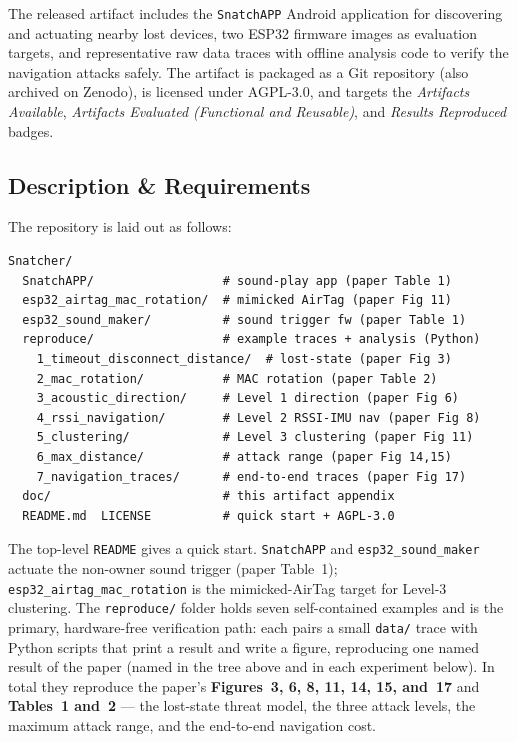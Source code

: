 \documentclass[nonacm,sigconf]{acmart}
\begin{document}
The released artifact includes the \texttt{SnatchAPP} Android application for
discovering and actuating nearby lost devices, two ESP32 firmware images as
evaluation targets, and representative raw data traces with offline analysis
code to verify the navigation attacks safely. The artifact is packaged as a Git
repository (also archived on Zenodo), is licensed under AGPL-3.0, and targets the
\emph{Artifacts Available}, \emph{Artifacts Evaluated (Functional and
Reusable)}, and \emph{Results Reproduced} badges.

\subsection{Description \& Requirements}
The repository is laid out as follows:

\noindent\begin{minipage}{\linewidth}
\begin{lstlisting}
Snatcher/
  SnatchAPP/                  # sound-play app (paper Table 1)
  esp32_airtag_mac_rotation/  # mimicked AirTag (paper Fig 11)
  esp32_sound_maker/          # sound trigger fw (paper Table 1)
  reproduce/                  # example traces + analysis (Python)
    1_timeout_disconnect_distance/  # lost-state (paper Fig 3)
    2_mac_rotation/           # MAC rotation (paper Table 2)
    3_acoustic_direction/     # Level 1 direction (paper Fig 6)
    4_rssi_navigation/        # Level 2 RSSI-IMU nav (paper Fig 8)
    5_clustering/             # Level 3 clustering (paper Fig 11)
    6_max_distance/           # attack range (paper Fig 14,15)
    7_navigation_traces/      # end-to-end traces (paper Fig 17)
  doc/                        # this artifact appendix
  README.md  LICENSE          # quick start + AGPL-3.0
\end{lstlisting}
\end{minipage}

\noindent The top-level \texttt{README} gives a quick start. \texttt{SnatchAPP}
and \texttt{esp32\_sound\_maker} actuate the non-owner sound trigger (paper
Table~1); \texttt{esp32\_airtag\_mac\_rotation} is the mimicked-AirTag target for
Level-3 clustering. The \texttt{reproduce/} folder holds seven self-contained
examples and is the primary, hardware-free verification path: each pairs a small
\texttt{data/} trace with Python scripts that print a result and write a figure,
reproducing one named result of the paper (named in the tree above and in each
experiment below). In total they reproduce the paper's \textbf{Figures~3, 6, 8,
11, 14, 15, and~17} and \textbf{Tables~1 and~2} --- the lost-state threat model,
the three attack levels, the maximum attack range, and the end-to-end navigation
cost.
\end{document}
